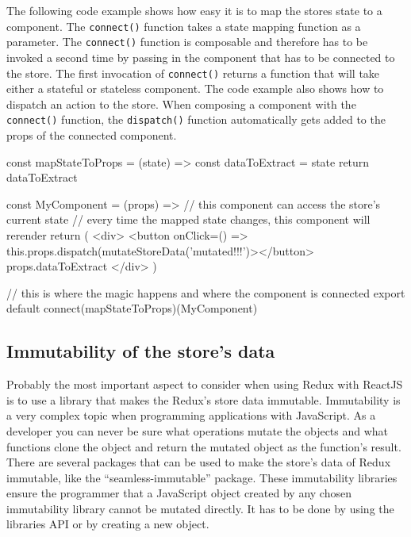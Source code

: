 The following code example shows how easy it is to map the stores state to a component. The \texttt{connect()} function takes a state mapping function as a parameter. The \texttt{connect()} function is composable and therefore has to be invoked a second time by passing in the component that has to be connected to the store. The first invocation of \texttt{connect()} returns a function that will take either a stateful or stateless component. The code example also shows how to dispatch an action to the store. When composing a component with the \texttt{connect()} function, the \texttt{dispatch()} function automatically gets added to the props of the connected component. \newline

\begin{JsCode}
const mapStateToProps = (state) => {
  const { dataToExtract } = state
  return { dataToExtract }
}

const MyComponent = (props) => {
  // this component can access the store's current state
  // every time the mapped state changes, this component will rerender
  return (
    <div>
      <button onClick={() => this.props.dispatch(mutateStoreData('mutated!!!')}></button>
      {props.dataToExtract}
    </div>
  )
}

// this is where the magic happens and where the component is connected
export default connect(mapStateToProps)(MyComponent)
\end{JsCode}


\subsection{Immutability of the store's data}

Probably the most important aspect to consider when using Redux with ReactJS is to use a library that makes the Redux's store data immutable. Immutability is a very complex topic when programming applications with JavaScript. As a developer you can never be sure what operations mutate the objects and what functions clone the object and return the mutated object as the function's result. There are several packages that can be used to make the store's data of Redux immutable, like the \enquote{seamless-immutable} package. These immutability libraries ensure the programmer that a JavaScript object created by any chosen immutability library cannot be mutated directly. It has to be done by using the libraries API or by creating a new object.

